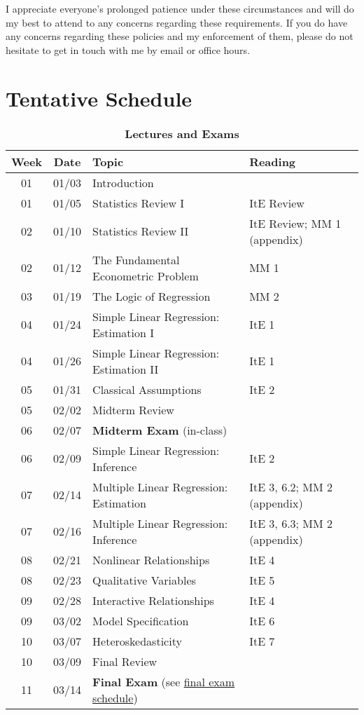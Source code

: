 \documentclass[10pt]{article}
\newcommand{\ra}[1]{\renewcommand{\arraystretch}{#1}}
\begin{document}
\bigskip

\noindent I appreciate everyone's prolonged patience under these circumstances and will do my best to attend to any concerns regarding these requirements.
If you do have any concerns regarding these policies and my enforcement of them, please do not hesitate to get in touch with me by email or office hours. 


\newpage
\section*{Tentative Schedule}

\begin{table}[h!]
	\caption*{\large\textbf{Lectures and Exams}}
	\centering
	\ra{1.5}
	\begin{tabular}{@{\extracolsep{0.5cm}} c c l l @{}}
		\toprule
		\textbf{Week} & \textbf{Date} & \textbf{Topic} & \textbf{Reading}  \\ \toprule
		01 & 01/03 & Introduction & \\
		01 & 01/05 & Statistics Review I & ItE Review \\
		02 & 01/10 & Statistics Review II & ItE Review; MM 1 (appendix) \\
		02 & 01/12 & The Fundamental Econometric Problem & MM 1 \\
		03 & 01/19 & The Logic of Regression & MM 2  \\
		04 & 01/24 & Simple Linear Regression: Estimation I & ItE 1  \\ 
		04 & 01/26 & Simple Linear Regression: Estimation II & ItE 1\\ 
		05 & 01/31 & Classical Assumptions & ItE 2   \\ 
		05 & 02/02 & Midterm Review & \\ \midrule
		06 & 02/07 & \textbf{Midterm Exam} (in-class) & \\ \midrule
		06 & 02/09 & Simple Linear Regression: Inference & ItE 2 \\
		07 & 02/14 & Multiple Linear Regression: Estimation & ItE 3, 6.2; MM 2 (appendix) \\
		07 & 02/16 & Multiple Linear Regression: Inference & ItE 3, 6.3; MM 2 (appendix) \\
		08 & 02/21 & Nonlinear Relationships  &  ItE 4  \\ 
		08 & 02/23 & Qualitative Variables & ItE 5 \\ 
		09 & 02/28 & Interactive Relationships & ItE 4  \\
		09 & 03/02 & Model Specification & ItE 6  \\
		10 & 03/07 & Heteroskedasticity &  ItE 7 \\
		10 & 03/09 & Final Review &   \\ \midrule
		11 & 03/14 & \textbf{Final Exam} (see \href{https://registrar.uoregon.edu/calendars/examinations#complete-final-exam-schedule}{final exam schedule}) & \\
		\bottomrule
	\end{tabular}
\end{table}
\end{document}
